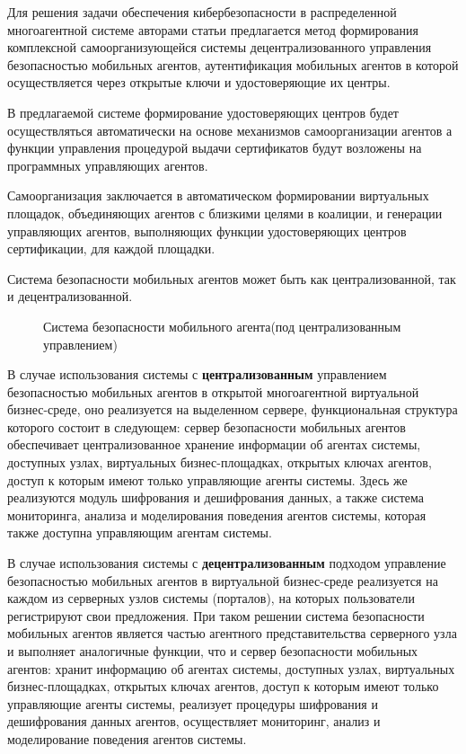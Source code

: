 Для решения задачи обеспечения кибербезопасности в распределенной многоагентной системе авторами статьи \cite{mob}
предлагается метод формирования комплексной самоорганизующейся системы децентрализованного управления безопасностью
мобильных агентов, аутентификация мобильных агентов в которой осуществляется через открытые ключи и
удостоверяющие их центры.

В предлагаемой системе формирование удостоверяющих центров будет осуществляться автоматически на основе механизмов
самоорганизации агентов а функции управления процедурой выдачи сертификатов будут возложены на программных
управляющих агентов.

Самоорганизация заключается в автоматическом формировании виртуальных площадок, объединяющих
агентов с близкими целями в коалиции, и генерации управляющих агентов, выполняющих функции удостоверяющих центров
сертификации, для каждой площадки.

Система безопасности мобильных агентов может быть как централизованной, так и децентрализованной.
\begin{figure}
    \caption{Система безопасности мобильного агента(под централизованным управлением) \cite{mob}}
    \label{mobag}
\end{figure}

В случае использования системы с \textbf{централизованным} управлением безопасностью мобильных агентов в
открытой многоагентной виртуальной бизнес-среде, оно реализуется на выделенном сервере, функциональная
структура которого состоит в следующем: сервер безопасности мобильных агентов обеспечивает
централизованное хранение информации об агентах системы, доступных узлах, виртуальных бизнес-площадках,
открытых ключах агентов, доступ к которым имеют только управляющие агенты системы. Здесь же реализуются
модуль шифрования и дешифрования данных, а также система мониторинга, анализа и моделирования поведения
агентов системы, которая также доступна управляющим агентам системы.

В случае использования системы с \textbf{децентрализованным} подходом управление безопасностью мобильных агентов
в виртуальной бизнес-среде реализуется на каждом из серверных узлов системы
(порталов), на которых пользователи регистрируют свои предложения. При таком решении система безопасности
мобильных агентов является
частью агентного представительства серверного узла и выполняет аналогичные функции, что и сервер безопасности
мобильных агентов: хранит информацию об агентах системы, доступных узлах, виртуальных бизнес-площадках,
открытых ключах агентов, доступ к которым имеют только управляющие агенты системы, реализует процедуры
шифрования и дешифрования данных агентов, осуществляет мониторинг, анализ и моделирование поведения агентов
системы.

